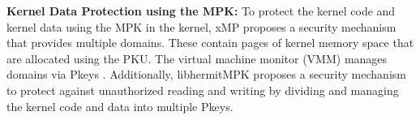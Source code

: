 {\bf Kernel Data Protection using the MPK:}
%
To protect the kernel code and kernel data using the MPK in the kernel, xMP
proposes a security mechanism that provides multiple domains. These contain
pages of kernel memory space that are allocated using the PKU. The virtual
machine monitor (VMM) manages domains via Pkeys \cite{xmp}.
Additionally, libhermitMPK proposes a security mechanism to protect against
unauthorized reading and writing by dividing and managing the kernel code and
data into multiple Pkeys\cite{libhermitmpk}.
%



